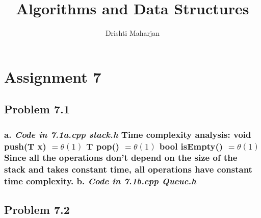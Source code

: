 \documentclass[a4paper,12pt]{article}
\begin{document}
\title{Algorithms and Data Structures }
\author{Drishti Maharjan}
\maketitle

\section*{\center Assignment 7}
\newpage
\subsection*{Problem 7.1 \newline}
\subsubsection*{\textnormal{a. \textit{ Code in 7.1a.cpp stack.h} \newline
Time complexity analysis: \newline
void push(T x) $ = \theta(1) $ \newline
T pop() $ =  \theta (1) $ \newline
bool isEmpty() $ = \theta(1) $ \newline
Since all the operations don't depend on the size of the stack and takes constant time, all operations have constant time complexity.\newline \newline 
b. \textit{ Code in 7.1b.cpp Queue.h }\newline  }}

\subsection*{ Problem 7.2 }
\end{document}
